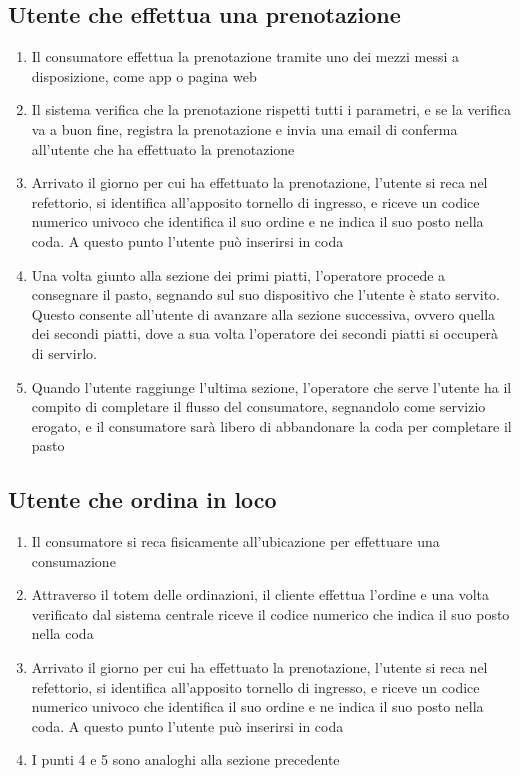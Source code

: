 \documentclass[a4paper, titlepage, 12pt, openright, twoside]{book}
\begin{document}
\subsection{Utente che effettua una prenotazione}
\begin{enumerate}
	\item Il consumatore effettua la prenotazione tramite uno dei mezzi messi a disposizione, come app o pagina web
	\item Il sistema verifica che la prenotazione rispetti tutti i parametri, e se la verifica va a buon fine, registra la prenotazione
		  e invia una email di conferma all'utente che ha effettuato la prenotazione
	\item Arrivato il giorno per cui ha effettuato la prenotazione, l'utente si reca nel refettorio, si identifica all'apposito tornello di ingresso,
		  e riceve un codice numerico univoco che identifica il suo ordine e ne indica il suo posto nella coda. A questo punto l'utente può inserirsi in coda
	\item Una volta giunto alla sezione dei primi piatti, l'operatore procede a consegnare il pasto, segnando sul suo dispositivo che l'utente è stato servito.
		  Questo consente all'utente di avanzare alla sezione successiva, ovvero quella dei secondi piatti, dove a sua volta l'operatore dei secondi piatti si occuperà di servirlo.
	\item Quando l'utente raggiunge l'ultima sezione, l'operatore che serve l'utente ha il compito di completare il flusso del consumatore, segnandolo come servizio erogato,
		  e il consumatore sarà libero di abbandonare la coda per completare il pasto
\end{enumerate}

\subsection{Utente che ordina in loco}
\begin{enumerate}
	\item Il consumatore si reca fisicamente all'ubicazione per effettuare una consumazione
	\item Attraverso il totem delle ordinazioni, il cliente effettua l'ordine e una volta verificato dal sistema centrale riceve il codice numerico che indica il suo posto nella coda
	\item Arrivato il giorno per cui ha effettuato la prenotazione, l'utente si reca nel refettorio, si identifica all'apposito tornello di ingresso,
		  e riceve un codice numerico univoco che identifica il suo ordine e ne indica il suo posto nella coda. A questo punto l'utente può inserirsi in coda
	\item I punti 4 e 5 sono analoghi alla sezione precedente
\end{enumerate}
\end{document}
